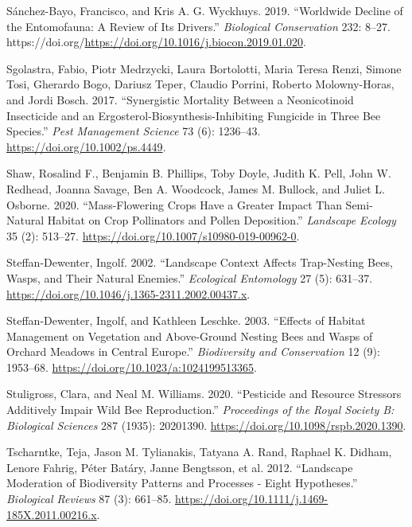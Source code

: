 \documentclass[smallextended]{svjour3}       %
\newlength{\cslhangindent}
\newenvironment{CSLReferences}[2] %
 {%
  \setlength{\parindent}{0pt}
  \ifodd #1 \everypar{\setlength{\hangindent}{\cslhangindent}}\ignorespaces\fi
  \ifnum #2 > 0
  \setlength{\parskip}{#2\baselineskip}
  \fi
 }%
 {}
\begin{document}
\begin{CSLReferences}{1}{0}
\leavevmode{}%
Sánchez-Bayo, Francisco, and Kris A. G. Wyckhuys. 2019. {``Worldwide
Decline of the Entomofauna: A Review of Its Drivers.''} \emph{Biological
Conservation} 232: 8--27.
https://doi.org/\url{https://doi.org/10.1016/j.biocon.2019.01.020}.

\leavevmode{}%
Sgolastra, Fabio, Piotr Medrzycki, Laura Bortolotti, Maria Teresa Renzi,
Simone Tosi, Gherardo Bogo, Dariusz Teper, Claudio Porrini, Roberto
Molowny-Horas, and Jordi Bosch. 2017. {``Synergistic Mortality Between a
Neonicotinoid Insecticide and an Ergosterol-Biosynthesis-Inhibiting
Fungicide in Three Bee Species.''} \emph{Pest Management Science} 73
(6): 1236--43. \url{https://doi.org/10.1002/ps.4449}.

\leavevmode{}%
Shaw, Rosalind F., Benjamin B. Phillips, Toby Doyle, Judith K. Pell,
John W. Redhead, Joanna Savage, Ben A. Woodcock, James M. Bullock, and
Juliet L. Osborne. 2020. {``Mass-Flowering Crops Have a Greater Impact
Than Semi-Natural Habitat on Crop Pollinators and Pollen Deposition.''}
\emph{Landscape Ecology} 35 (2): 513--27.
\url{https://doi.org/10.1007/s10980-019-00962-0}.

\leavevmode{}%
Steffan-Dewenter, Ingolf. 2002. {``Landscape Context Affects
Trap-Nesting Bees, Wasps, and Their Natural Enemies.''} \emph{Ecological
Entomology} 27 (5): 631--37.
\url{https://doi.org/10.1046/j.1365-2311.2002.00437.x}.

\leavevmode{}%
Steffan-Dewenter, Ingolf, and Kathleen Leschke. 2003. {``Effects of
Habitat Management on Vegetation and Above-Ground Nesting Bees and Wasps
of Orchard Meadows in Central Europe.''} \emph{Biodiversity and
Conservation} 12 (9): 1953--68.
\url{https://doi.org/10.1023/a:1024199513365}.

\leavevmode{}%
Stuligross, Clara, and Neal M. Williams. 2020. {``Pesticide and Resource
Stressors Additively Impair Wild Bee Reproduction.''} \emph{Proceedings
of the Royal Society B: Biological Sciences} 287 (1935): 20201390.
\url{https://doi.org/10.1098/rspb.2020.1390}.

\leavevmode{}%
Tscharntke, Teja, Jason M. Tylianakis, Tatyana A. Rand, Raphael K.
Didham, Lenore Fahrig, Péter Batáry, Janne Bengtsson, et al. 2012.
{``Landscape Moderation of Biodiversity Patterns and Processes - Eight
Hypotheses.''} \emph{Biological Reviews} 87 (3): 661--85.
\url{https://doi.org/10.1111/j.1469-185X.2011.00216.x}.


\end{CSLReferences}
\end{document}
